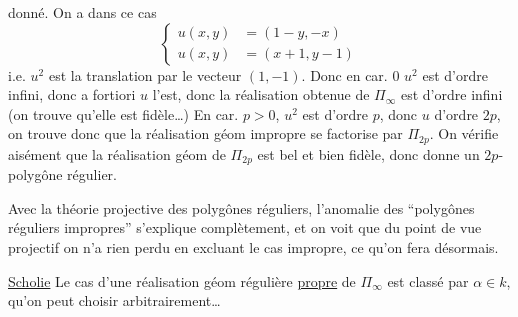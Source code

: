 donné. On a dans ce cas
\[ \left\{\begin{aligned}u(x,y)&=(1-y,-x)\\
u(x,y)&=(x+1,y-1)\end{aligned}\right. \tag*{(25)} \]
i.e. $u^2$ est la translation par le vecteur $(1,-1)$.
Donc en car. $0$ $u^2$ est d'ordre infini, donc
a fortiori $u$ l'est, donc la réalisation obtenue
de $\Pi_\infty$ est d'ordre infini (on trouve
qu'elle est fidèle\ldots) En car. $p>0$, $u^2$ est
d'ordre $p$, donc $u$ d'ordre $2p$, on trouve
 donc que la réalisation géom impropre
se factorise par $\Pi_{2p}$. On vérifie
aisément que la réalisation géom de $\Pi_{2p}$
est bel et bien fidèle, donc donne un
$2p$-polygône régulier.

Avec la théorie projective des polygônes
réguliers, l'anomalie  des ``polygônes
réguliers impropres'' s'explique complètement, et on voit que du point de vue
projectif on n'a rien perdu en excluant
le cas impropre, ce qu'on fera désormais.

\uline{Scholie} Le cas d'une réalisation géom
régulière \uline{propre} de $\Pi_\infty$ est classé par $\alpha\in k$,
qu'on peut choisir arbitrairement\ldots
